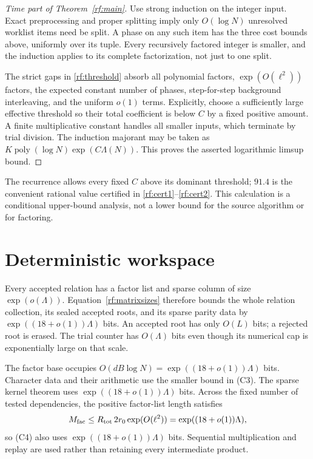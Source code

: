 \begin{proof}[Time part of Theorem~\ref{rf:main}]
Use strong induction on the integer input.  Exact preprocessing
and proper splitting imply only $O(\log N)$ unresolved worklist
items need be split.  A phase on any such item has the three
cost bounds above, uniformly over its tuple.  Every recursively
factored integer is smaller, and the induction applies to its
complete factorization, not just to one split.

The strict gaps in \eqref{rf:threshold} absorb all polynomial
factors, $\exp(O(\ell^2))$ factors, the expected constant number
of phases, step-for-step background interleaving, and the
uniform $o(1)$ terms.  Explicitly, choose a sufficiently large
effective threshold so their total coefficient is below $C$ by
a fixed positive amount.  A finite multiplicative constant
handles all smaller inputs, which terminate by trial division.
The induction majorant may be taken as
$K\operatorname{poly}(\log N)\exp(C\Lambda(N))$.
This proves the asserted logarithmic limsup bound.
\end{proof}

The recurrence allows every fixed $C$ above its dominant threshold;
$91.4$ is the convenient rational value certified in
\eqref{rf:cert1}--\eqref{rf:cert2}.  This calculation is a
conditional upper-bound analysis, not a lower bound for the source
algorithm or for factoring.

\section{Deterministic workspace}
\label{rf:space}

Every accepted relation has a factor list and sparse column of
size $\exp(o(\Lambda))$.  Equation~\eqref{rf:matrixsizes} therefore
bounds the whole relation collection, its sealed accepted roots,
and its sparse parity data by $\exp((18+o(1))\Lambda)$ bits.
An accepted root has only $O(L)$ bits; a rejected root is erased.
The trial counter has $O(\Lambda)$ bits even though its numerical
cap is exponentially large on that scale.

The factor base occupies $O(dB\log N)=\exp((18+o(1))\Lambda)$
bits.  Character data and their arithmetic use the smaller bound
in \textup{(C3)}.  The sparse kernel theorem uses
$\exp((18+o(1))\Lambda)$ bits.  Across the fixed number of
tested dependencies, the positive factor-list length satisfies
\[
 M_{\rm fac}\le R_{\rm tot}\,2r_0\exp(O(\ell^2))
              =\exp((18+o(1))\Lambda),
\]
so \textup{(C4)} also uses
$\exp((18+o(1))\Lambda)$ bits.  Sequential multiplication and
replay are used rather than retaining every intermediate product.

